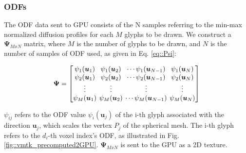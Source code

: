 \documentclass[twoside,twocolumn,10pt]{article}
\begin{document}
\subsubsection{ODFs}

The ODF data sent to GPU consists of the N samples referring to the min-max normalized diffusion profiles for each $M$ glyphs to be drawn. We construct a $\bm{\Psi}_{MxN}$ matrix, where $M$ is the number of glyphs to be drawn, and $N$ is the number of samples of ODF used, as given in Eq. \ref{eq::Psi}:

\begin{equation}
\label{eq::Psi}
\bm{\Psi} = 
\begingroup %
\setlength\arraycolsep{2pt}
\begin{bmatrix} 
    \psi_1(\bm{u}_1) & \psi_1(\bm{u}_2) & \cdots \psi_1(\bm{u}_{N-1}) & \psi_1(\bm{u}_{N})  \\    
     \psi_2(\bm{u}_1)& \psi_2(\bm{u}_2) & \cdots \psi_2(\bm{u}_{N-1}) & \psi_2(\bm{u}_{N}) \\
    \vdots & \vdots & \vdots & \vdots  \\    
     \psi_M(\bm{u}_1)&\psi_M(\bm{u}_2) & \cdots \psi_M(\bm{u}_{N-1}) & \psi_M(\bm{u}_{N})
\end{bmatrix}
\endgroup
\end{equation}

$\psi_{ij}$ refers to the ODF value $\psi_i(\bm{u}_j)$ of the i-th glyph associated with the direction $\bm{u}_j$, which scales the vertex $P_j$ of the spherical mesh. The i-th glyph refers to the $d_i$-th voxel index's ODF, as illustrated in Fig. \ref{fig::vmtk_precomputed2GPU}. $\bm{\Psi}_{MxN}$ is sent to the GPU as a 2D texture.

\end{document}
